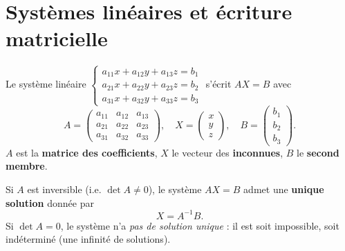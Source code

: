 \section{Systèmes linéaires et écriture matricielle}

\begin{definition}[Écriture matricielle $AX=B$]
Le système linéaire
$\left\{\begin{array}{l}a_{11}x+a_{12}y+a_{13}z=b_1\\ a_{21}x+a_{22}y+a_{23}z=b_2\\
a_{31}x+a_{32}y+a_{33}z=b_3\end{array}\right.$
s'écrit $AX=B$ avec
\[
A=\begin{pmatrix}a_{11}&a_{12}&a_{13}\\a_{21}&a_{22}&a_{23}\\a_{31}&a_{32}&a_{33}\end{pmatrix},\quad
X=\begin{pmatrix}x\\y\\z\end{pmatrix},\quad B=\begin{pmatrix}b_1\\b_2\\b_3\end{pmatrix}.
\]
$A$ est la \textbf{matrice des coefficients}, $X$ le vecteur des \textbf{inconnues}, $B$ le
\textbf{second membre}.
\end{definition}

\begin{theoreme}
Si $A$ est inversible (i.e. $\det A\neq0$), le système $AX=B$ admet une \textbf{unique
solution} donnée par
\[
X=A^{-1}B.
\]
Si $\det A=0$, le système n'a \emph{pas de solution unique} : il est soit impossible, soit
indéterminé (une infinité de solutions).
\end{theoreme}

